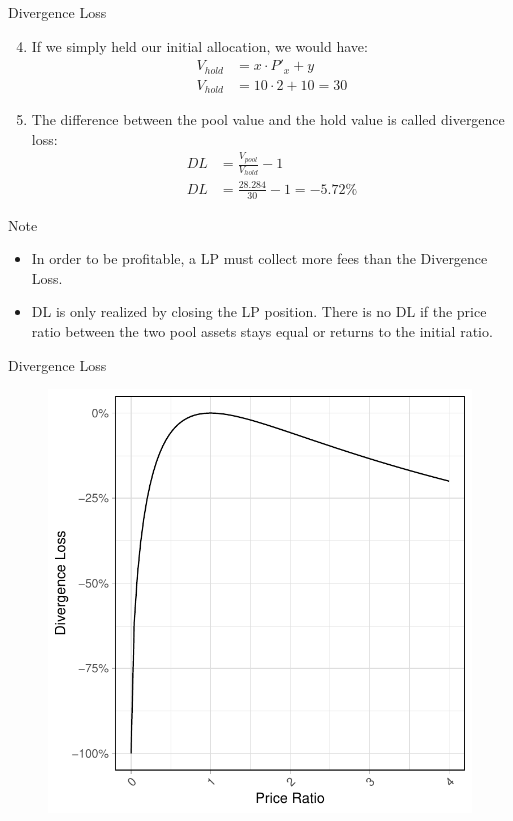 \documentclass[]{beamer}
\begin{document}
\begin{frame}{Divergence Loss}

	\begin{enumerate}
	\setcounter{enumi}{3}
		\item If we simply held our initial allocation, we would have:
			\begin{align*}
				V_{hold} &= x \cdot P'_x + y\\
				V_{hold} &= 10 \cdot 2 + 10 = 30
			\end{align*}
		\item The difference between the pool value and the hold value is called divergence loss:
			\begin{align*}
				DL &= \tfrac{V_{pool}}{V_{hold}} - 1\\
				DL &= \tfrac{28.284}{30} - 1 = -5.72 \%
			\end{align*}
	\end{enumerate}	
	
	\begin{keytakeaway}{Note}
		\begin{itemize}
			\item In order to be profitable, a LP must collect more fees than the Divergence Loss.
			\item DL is only realized by closing the LP position. There is no DL if the price ratio between the two pool assets stays equal or returns to the initial ratio.
		\end{itemize}
	\end{keytakeaway}
	
\end{frame}


\begin{frame}{Divergence Loss}
	\begin{figure}
		\includegraphics[scale=0.6]{../assets/images/divergence-loss.pdf}
	\end{figure}
\end{frame}
\end{document}
